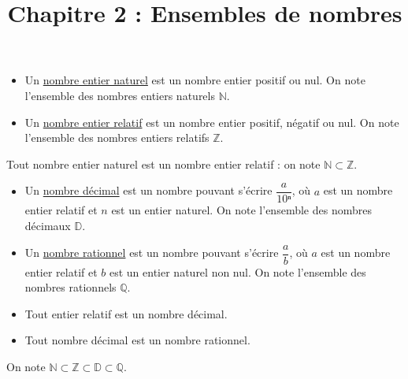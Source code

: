 \documentclass[classe=$2^{de}$]{coursclass}
\title{Chapitre 2 : Ensembles de nombres}
\date{}
\author{}
\begin{document}
\maketitle

\begin{definition}[Entiers]
	\begin{itemize}
		\item Un \uline{nombre entier naturel} est un nombre entier positif ou nul. On note l'ensemble des nombres entiers naturels $ℕ$.
		\item Un \uline{nombre entier relatif} est un nombre entier positif, négatif ou nul. On note l'ensemble des nombres entiers relatifs $ℤ$. %
	\end{itemize}
\end{definition}

\begin{remarque}
	Tout nombre entier naturel est un nombre entier relatif : on note $ℕ ⊂ ℤ$.
\end{remarque}

\begin{definition}
	\begin{itemize}
		\item Un \uline{nombre décimal} est un nombre pouvant s'écrire $\dfrac{a}{10ⁿ}$, où $a$ est un nombre entier relatif et $n$ est un entier naturel. On note l'ensemble des nombres décimaux $𝔻$.
		\item Un \uline{nombre rationnel} est un nombre pouvant s'écrire $\dfrac{a}{b}$, où $a$ est un nombre entier relatif et $b$ est un entier naturel non nul. On note l'ensemble des nombres rationnels $ℚ$. %
	\end{itemize}
\end{definition}

\begin{remarque}
	\begin{itemize}
		\item Tout entier relatif est un nombre décimal.
		\item Tout nombre décimal est un nombre rationnel.
	\end{itemize}
	On note $ℕ ⊂ ℤ ⊂ 𝔻 ⊂ ℚ$.
\end{remarque}
\end{document}

